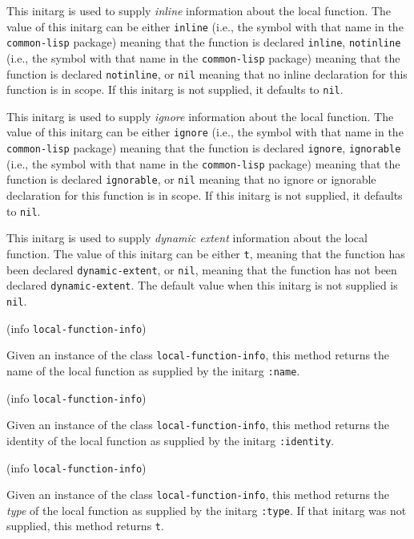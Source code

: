 
This initarg is used to supply \emph{inline} information about the
local function.  The value of this initarg can be either
\texttt{inline} (i.e., the symbol with that name in the
\texttt{common-lisp} package) meaning that the function is declared
\texttt{inline}, \texttt{notinline} (i.e., the symbol with that name
in the \texttt{common-lisp} package) meaning that the function is
declared \texttt{notinline}, or \texttt{nil} meaning that no inline
declaration for this function is in scope.  If this initarg is not
supplied, it defaults to \texttt{nil}.


This initarg is used to supply \emph{ignore} information about the
local function.  The value of this initarg can be either
\texttt{ignore} (i.e., the symbol with that name in the
\texttt{common-lisp} package) meaning that the function is declared
\texttt{ignore}, \texttt{ignorable} (i.e., the symbol with that name
in the \texttt{common-lisp} package) meaning that the function is
declared \texttt{ignorable}, or \texttt{nil} meaning that no ignore or
ignorable declaration for this function is in scope.  If this initarg
is not supplied, it defaults to \texttt{nil}.


This initarg is used to supply \emph{dynamic extent} information about
the local function.  The value of this initarg can be either
\texttt{t}, meaning that the function has been declared
\texttt{dynamic-extent}, or \texttt{nil}, meaning that the function
has not been declared \texttt{dynamic-extent}.  The default value when
this initarg is not supplied is \texttt{nil}. 

 {(info {\tt local-function-info})}

Given an instance of the class \texttt{local-function-info}, this
method returns the name of the local function as supplied by the
initarg \texttt{:name}.

 {(info {\tt local-function-info})}

Given an instance of the class \texttt{local-function-info}, this
method returns the identity of the local function as supplied by the
initarg \texttt{:identity}.

 {(info {\tt local-function-info})}

Given an instance of the class \texttt{local-function-info}, this
method returns the \emph{type} of the local function as supplied by the
initarg \texttt{:type}.  If that initarg was not supplied, this method
returns \texttt{t}.

